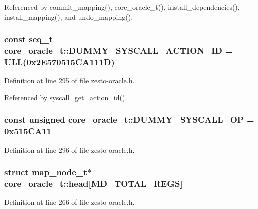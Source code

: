 Referenced by commit\_\-mapping(), core\_\-oracle\_\-t(), install\_\-dependencies(), install\_\-mapping(), and undo\_\-mapping().
\subsubsection[{DUMMY\_\-SYSCALL\_\-ACTION\_\-ID}]{\setlength{\rightskip}{0pt plus 5cm}const {\bf seq\_\-t} {\bf core\_\-oracle\_\-t::DUMMY\_\-SYSCALL\_\-ACTION\_\-ID} = ULL(0x2E570515CA111D)\hspace{0.3cm}{\tt  [static, protected]}}\label{classcore__oracle__t_7ae3e4395fe930b73847748c92d269de}




Definition at line 295 of file zesto-oracle.h.

Referenced by syscall\_\-get\_\-action\_\-id().
\subsubsection[{DUMMY\_\-SYSCALL\_\-OP}]{\setlength{\rightskip}{0pt plus 5cm}const unsigned {\bf core\_\-oracle\_\-t::DUMMY\_\-SYSCALL\_\-OP} = 0x515CA11\hspace{0.3cm}{\tt  [static, protected]}}\label{classcore__oracle__t_1b88181def235b9f82b8a32dc0503b15}




Definition at line 296 of file zesto-oracle.h.
\subsubsection[{head}]{\setlength{\rightskip}{0pt plus 5cm}struct {\bf map\_\-node\_\-t}$\ast$ {\bf core\_\-oracle\_\-t::head}[MD\_\-TOTAL\_\-REGS]\hspace{0.3cm}{\tt  [read]}}\label{classcore__oracle__t_90b2a74b8c369dec9adcedad77ebe766}




Definition at line 266 of file zesto-oracle.h.
